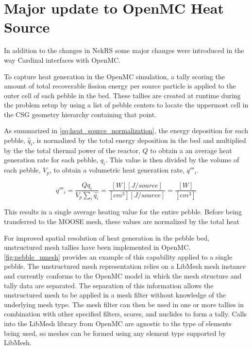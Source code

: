 \section{Major update to OpenMC Heat Source} 
\label{s:openmc_tallies}

In addition to the changes in NekRS some major changes were introduced in the way Cardinal interfaces with OpenMC.

To capture heat generation in the OpenMC simulation, a tally scoring the amount of total recoverable fission energy per source particle is applied to the outer cell of each pebble in the bed. 
These tallies are created at runtime during the problem setup by using a list of pebble centers to locate the uppermost cell in the CSG geometry hierarchy containing that point.

As summarized in \autoref{eq:heat_source_normalization}, the energy deposition for each pebble, $\hat{q}_{i}$, is normalized by the total energy deposition in the bed and multiplied by the the total thermal power of the reactor, $Q$ to obtain a an average heat generation rate for each pebble, $q_i$. This value is then divided by the volume of each pebble, $V_p$, to obtain a volumetric heat generation rate, $q'''_i$.

\begin{equation}
    \label{eq:heat_source_normalization}
    q'''_i = \frac{Q q_i}{V_{p}\sum_{i}{\hat{q_i}}} = \frac{[W][J/source]}{[cm^{3}] [J/source]} = \frac{[W]}{[cm^{3}]}
\end{equation}

This results in a single average heating value for the entire pebble. Before being transferred to the MOOSE mesh, these values are normalized by the total heat

For improved spatial resolution of heat generation in the pebble bed, unstructured mesh tallies have been implemented in OpenMC.
\autoref{fig:pebble_umesh} provides an example of this capability applied to a single pebble.
The unstructured mesh representation relies on a LibMesh mesh instance and currently conforms to the OpenMC model in which the mesh structure and tally data are separated.
The separation of this information allows the unstructured mesh to be applied in a mesh filter without knowledge of the underlying mesh type.
The mesh filter can then be used in one or more tallies in combination with other specified filters, scores, and nuclides to form a tally.
Calls into the LibMesh library from OpenMC are agnostic to the type of elements being used, so meshes can be formed using any element type supported by LibMesh.

